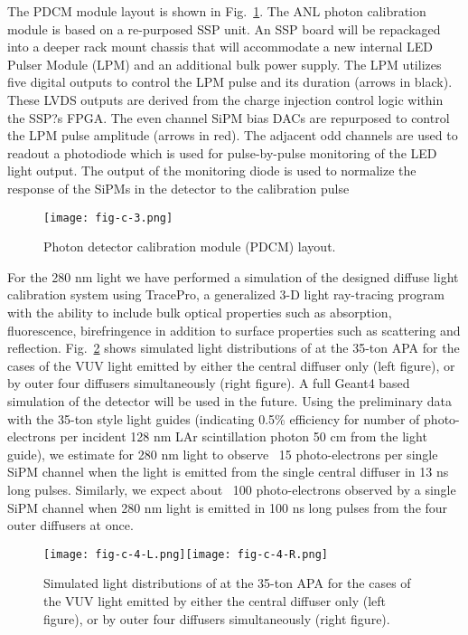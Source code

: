 The PDCM module layout is shown in Fig.~\ref{fig:fig-c-3}. The ANL
photon calibration module is based on a re-purposed SSP unit.  An SSP
board will be repackaged into a deeper rack mount chassis that will
accommodate a new internal LED Pulser Module (LPM) and an additional
bulk power supply. The LPM utilizes five digital outputs to control
the LPM pulse and its duration (arrows in black).  These LVDS outputs
are derived from the charge injection control logic within the SSP?s
FPGA.  The even channel SiPM bias DACs are repurposed to control the
LPM pulse amplitude (arrows in red).  The adjacent odd channels are
used to readout a photodiode which is used for pulse-by-pulse
monitoring of the LED light output.  The output of the monitoring
diode is used to normalize the response of the SiPMs in the detector
to the calibration pulse

%
 \begin{figure}[h]
  \centering
\texttt{[image: fig-c-3.png]}
\caption{Photon detector calibration module (PDCM) layout.}
\label{fig:fig-c-3}
\end{figure}
%

For the 280 nm light we have performed a simulation of the designed
diffuse light calibration system using TracePro, a generalized 3-D
light ray-tracing program with the ability to include bulk optical
properties such as absorption, fluorescence, birefringence in addition
to surface properties such as scattering and
reflection. Fig.~\ref{fig:fig-c-4} shows simulated light distributions
of at the 35-ton APA for the cases of the VUV light emitted by either
the central diffuser only (left figure), or by outer four diffusers
simultaneously (right figure). A full Geant4 based simulation of the
detector will be used in the future. Using the preliminary data with
the 35-ton style light guides (indicating 0.5\% efficiency for number
of photo-electrons per incident 128 nm LAr scintillation photon 50 cm
from the light guide), we estimate for 280 nm light to observe ~15
photo-electrons per single SiPM channel when the light is emitted from
the single central diffuser in 13 ns long pulses. Similarly, we expect
about ~100 photo-electrons observed by a single SiPM channel when 280
nm light is emitted in 100 ns long pulses from the four outer
diffusers at once.

%
 \begin{figure}[h]
  \centering
  \texttt{[image: fig-c-4-L.png]}\texttt{[image: fig-c-4-R.png]}
\caption{Simulated light distributions of at the 35-ton APA for the
  cases of the VUV light emitted by either the central diffuser only
  (left figure), or by outer four diffusers simultaneously (right
  figure).}
\label{fig:fig-c-4}
\end{figure}
%

